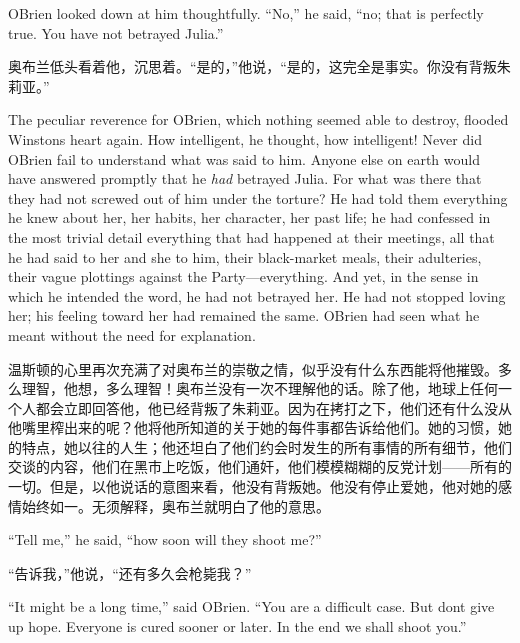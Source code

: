 \begin{paracol}{2}
\switchcolumn*

O\textquotesingle Brien looked down at him thoughtfully. ``No,'' he said,
``no; that is perfectly true. You have not betrayed Julia.''

\switchcolumn

奥布兰低头看着他，沉思着。``是的，''他说，``是的，这完全是事实。你没有背叛朱莉亚。''

\switchcolumn*

The peculiar reverence for O\textquotesingle Brien, which nothing seemed
able to destroy, flooded Winston\textquotesingle s heart again. How
intelligent, he thought, how intelligent! Never did
O\textquotesingle Brien fail to understand what was said to him. Anyone
else on earth would have answered promptly that he \emph{had} betrayed
Julia. For what was there that they had not screwed out of him under the
torture? He had told them everything he knew about her, her habits, her
character, her past life; he had confessed in the most trivial detail
everything that had happened at their meetings, all that he had said to
her and she to him, their black-market meals, their adulteries, their
vague plottings against the Party---everything. And yet, in the sense in
which he intended the word, he had not betrayed her. He had not stopped
loving her; his feeling toward her had remained the same.
O\textquotesingle Brien had seen what he meant without the need for
explanation.

\switchcolumn

温斯顿的心里再次充满了对奥布兰的崇敬之情，似乎没有什么东西能将他摧毁。多么理智，他想，多么理智！奥布兰没有一次不理解他的话。除了他，地球上任何一个人都会立即回答他，他已经背叛了朱莉亚。因为在拷打之下，他们还有什么没从他嘴里榨出来的呢？他将他所知道的关于她的每件事都告诉给他们。她的习惯，她的特点，她以往的人生；他还坦白了他们约会时发生的所有事情的所有细节，他们交谈的内容，他们在黑市上吃饭，他们通奸，他们模模糊糊的反党计划——所有的一切。但是，以他说话的意图来看，他没有背叛她。他没有停止爱她，他对她的感情始终如一。无须解释，奥布兰就明白了他的意思。

\switchcolumn*

``Tell me,'' he said, ``how soon will they shoot me?''

\switchcolumn

``告诉我，''他说，``还有多久会枪毙我？''

\switchcolumn*

``It might be a long time,'' said O\textquotesingle Brien. ``You are a
difficult case. But don\textquotesingle t give up hope. Everyone is
cured sooner or later. In the end we shall shoot you.''


\end{paracol}
